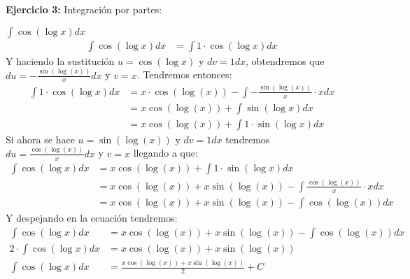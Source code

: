 \documentclass[../main.tex]{subfiles}
\begin{document}
    \question \textbf{Ejercicio 3:} Integración por partes:
    \begin{partes}
        \parte $\int \cos(\log x) dx$
        \begin{align*}
            \int \cos(\log x) dx &= \int 1 \cdot \cos(\log x) dx
        \end{align*}
        Y haciendo la sustitución $u = \cos(\log x)$ y $dv = 1 dx$, obtendremos que $du = -\frac{\sin(\log(x))}{x} dx$ y $v = x$. Tendremos entonces:
        \begin{align*}
            \int 1 \cdot \cos(\log x) dx &= x \cdot \cos(\log(x)) - \int -\frac{\sin(\log(x))}{x} \cdot x dx\\
            &= x\cos(\log(x)) + \int \sin(\log x) dx\\
            &= x\cos(\log(x)) + \int 1 \cdot \sin(\log x) dx
        \end{align*}
        Si ahora se hace $u = \sin(\log(x))$ y $dv = 1 dx$ tendremos $du = \frac{\cos(\log(x))}{x} dx$ y $v= x$ llegando a que:
        \begin{align*}
            \int \cos(\log x) dx  &= x\cos(\log(x)) + \int 1 \cdot \sin(\log x) dx\\
            &= x\cos(\log(x)) + x\sin(\log(x)) - \int \frac{\cos(\log(x))}{x} \cdot x dx\\
            &= x\cos(\log(x)) + x\sin(\log(x)) - \int \cos(\log(x)) dx
        \end{align*}
        Y despejando en la ecuación tendremos:
        \begin{align*}
            \int \cos(\log x) dx &= x\cos(\log(x)) + x\sin(\log(x)) - \int \cos(\log(x)) dx\\
            2 \cdot \int \cos(\log x) dx &= x\cos(\log(x)) + x\sin(\log(x)) \\
            \int \cos(\log x) dx &= \frac{x\cos(\log(x)) + x\sin(\log(x))}{2} + C
        \end{align*}
    \end{partes}
\end{document}
